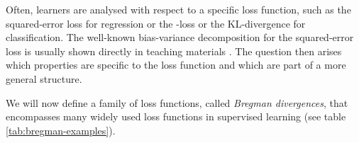 \documentclass[
    a4paper, %
	fontsize=10pt, %
	twoside=false, %
]{kaobook}
\begin{document}
Often, learners are analysed with respect to a specific loss function, such as the squared-error loss \cite{scornet_ConsistencyRandomForests_2015} for regression or the \zeroone-loss \cite{theisen_WhenAreEnsembles_2023} or the KL-divergence \cite{webb_EnsembleNotEnsemble_2019} for classification. The well-known bias-variance decomposition for the squared-error loss is usually shown directly in teaching materials \cite{tibshirani_ElementsStatisticalLearning_2017, weinberger_Lecture12Bias_}. The question then arises which properties are specific to the loss function and which are part of a more general structure.

We will now define a family of loss functions, called \textit{Bregman divergences}, that encompasses many widely used loss functions in supervised learning (see table \ref{tab:bregman-examples}). 
\end{document}
